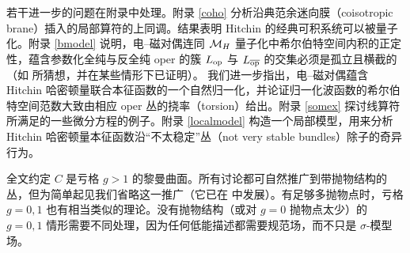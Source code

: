 若干进一步的问题在附录中处理。附录 \ref{coho} 分析沿典范余迷向膜（coisotropic brane）插入的局部算符的上同调。结果表明 Hitchin 的经典可积系统可以被量子化。附录 \ref{bmodel} 说明，电–磁对偶连同 ${\mathcal M}_H$ 量子化中希尔伯特空间内积的正定性，蕴含参数化全纯与反全纯 oper 的簇 $L_{\mathrm{op}}$ 与 $L_{\overline{\mathrm{op}}}$ 的交集必须是孤立且横截的（如 \cite{EFK} 所猜想，并在某些情形下已证明）。 我们进一步指出，电–磁对偶蕴含 Hitchin 哈密顿量联合本征函数的一个自然归一化，并论证归一化波函数的希尔伯特空间范数大致由相应 oper 丛的挠率（torsion）给出。附录 \ref{somex} 探讨线算符所满足的一些微分方程的例子。附录 \ref{localmodel} 构造一个局部模型，用来分析 Hitchin 哈密顿量本征函数沿“不太稳定”丛（not very stable bundles）除子的奇异行为。

全文约定 $C$ 是亏格 $g>1$ 的黎曼曲面。所有讨论都可自然推广到带抛物结构的丛，但为简单起见我们省略这一推广（它已在 \cite{EFK,EFK2,EFK3} 中发展）。有足够多抛物点时，亏格 $g=0,1$ 也有相当类似的理论。没有抛物结构（或对 $g=0$ 抛物点太少）的 $g=0,1$ 情形需要不同处理，因为任何低能描述都需要规范场，而不只是 $\sigma$-模型场。
